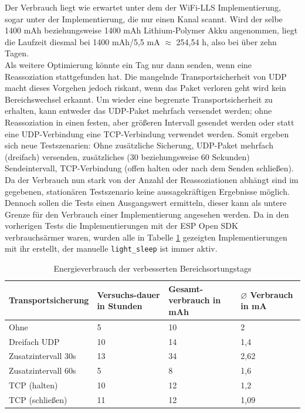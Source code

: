 Der Verbrauch liegt wie erwartet unter dem der WiFi-LLS Implementierung, sogar unter der Implementierung, die nur einen Kanal scannt.
Wird der selbe 1400 mAh beziehungsweise 1400 mAh Lithium-Polymer Akku angenommen, liegt die Laufzeit diesmal  bei 1400 mAh/5,5 mA $\approx$ 254,54 h, also bei über zehn Tagen. \\
Als weitere Optimierung könnte ein Tag nur dann senden, wenn eine Reassoziation stattgefunden hat.
Die mangelnde Transportsicherheit von UDP macht dieses Vorgehen jedoch riskant, wenn das Paket verloren geht wird kein Bereichswechsel erkannt.
Um wieder eine begrenzte Transportsicherheit zu erhalten, kann entweder das UDP-Paket mehrfach versendet werden; ohne Reassoziation in einen festen, aber größeren Intervall gesendet werden oder statt eine UDP-Verbindung eine TCP-Verbindung verwendet werden.
Somit ergeben sich neue Testszenarien: Ohne zusätzliche Sicherung, UDP-Paket mehrfach (dreifach) versenden, zusätzliches (30 beziehungsweise 60 Sekunden) Sendeintervall, TCP-Verbindung (offen halten oder nach dem Senden schließen). \\
Da der Verbrauch nun stark von der Anzahl der Reassoziationen abhängt sind im gegebenen, stationären Testszenario keine aussagekräftigen Ergebnisse möglich.
Dennoch sollen die Tests einen Ausgangswert ermitteln, dieser kann als untere Grenze für den Verbrauch einer Implementierung angesehen werden.
Da in den vorherigen Tests die Implementierungen mit der ESP Open SDK verbrauchsärmer waren, wurden alle in Tabelle \ref{table:naiveoptconsumption} gezeigten Implementierungen mit ihr erstellt, der manuelle \texttt{light\_sleep} ist immer aktiv.

\begin{table}[h]
	\centering
	\caption{Energieverbrauch der verbesserten Bereichsortungstags}
	\label{table:naiveoptconsumption}
	\begin{tabular}{p{3.5cm}|p{1.7cm}|p{2.5cm}|p{2.5cm}}
		Transportsicherung & Versuchs-dauer in Stunden & Gesamt-verbrauch in mAh & $\varnothing$ Verbrauch in mA \\
		\hline
		Ohne & 5 & 10 & 2 \\
		Dreifach UDP & 10 & 14 & 1,4 \\
		Zusatzintervall 30s & 13 & 34 & 2,62 \\
		Zusatzintervall 60s & 5 & 8 & 1,6 \\
		TCP (halten) & 10 & 12 & 1,2 \\
		TCP (schließen) & 11 & 12 & 1,09 \\
	\end{tabular}
\end{table}

